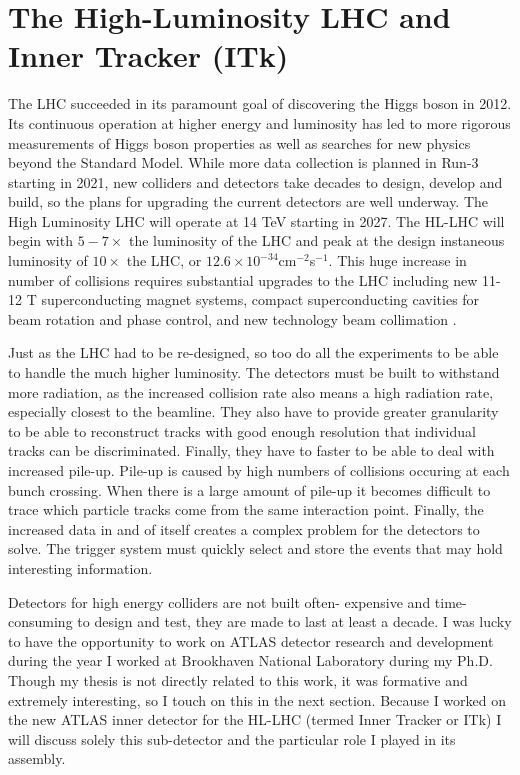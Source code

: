 \section{The High-Luminosity LHC and Inner Tracker (ITk)}
The LHC succeeded in its paramount goal of discovering the Higgs boson in 2012. Its continuous operation at higher energy and luminosity has led to more rigorous measurements of Higgs boson properties as well as searches for new physics beyond the Standard Model. While more data collection is planned in Run-3 starting in 2021, new colliders and detectors take decades to design, develop and build, so the plans for upgrading the current detectors are well underway. The High Luminosity LHC will operate at 14 TeV starting in 2027. The HL-LHC will begin with $5-7\times$ the luminosity of the LHC and peak at the design instaneous luminosity of $10\times$ the LHC, or $12.6\times10^{-34}$cm$^{-2}$s$^{-1}$. This huge increase in number of collisions requires substantial upgrades to the LHC including new 11-12 T superconducting magnet systems, compact superconducting cavities for beam rotation and phase control, and new technology beam collimation \cite{HLLHCYellow}. 

Just as the LHC had to be re-designed, so too do all the experiments to be able to handle the much higher luminosity. The detectors must be built to withstand more radiation, as the increased collision rate also means a high radiation rate, especially closest to the beamline. They also have to provide greater granularity to be able to reconstruct tracks with good enough resolution that individual tracks can be discriminated. Finally, they have to faster to be able to deal with increased pile-up. Pile-up is caused by high numbers of collisions occuring at each bunch crossing. When there is a large amount of pile-up it becomes difficult to trace which particle tracks come from the same interaction point. Finally, the increased data in and of itself creates a complex problem for the detectors to solve. The trigger system must quickly select and store the events that may hold interesting information. 

Detectors for high energy colliders are not built often- expensive and time-consuming to design and test, they are made to last at least a decade. I was lucky to have the opportunity to work on ATLAS detector research and development during the year I worked at Brookhaven National Laboratory during my Ph.D. Though my thesis is not directly related to this work, it was formative and extremely interesting, so I touch on this in the next section. Because I worked on the new ATLAS inner detector for the HL-LHC (termed Inner Tracker or ITk) I will discuss solely this sub-detector and the particular role I played in its assembly.

